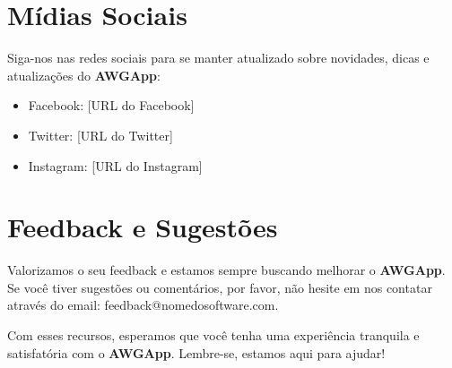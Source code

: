 \documentclass[12pt,a4paper]{book}
\newcommand{\nomesoftware}{AWGApp}
\begin{document}
\section{Mídias Sociais}

Siga-nos nas redes sociais para se manter atualizado sobre novidades, dicas e atualizações do \textbf{\nomesoftware{}}:

\begin{itemize}
    \item Facebook: [URL do Facebook]
    \item Twitter: [URL do Twitter]
    \item Instagram: [URL do Instagram]
\end{itemize}

\section{Feedback e Sugestões}

Valorizamos o seu feedback e estamos sempre buscando melhorar o \textbf{\nomesoftware{}}. Se você tiver sugestões ou comentários, por favor, não hesite em nos contatar através do email: feedback@nomedosoftware.com.

Com esses recursos, esperamos que você tenha uma experiência tranquila e satisfatória com o \textbf{\nomesoftware{}}. Lembre-se, estamos aqui para ajudar!
\end{document}
